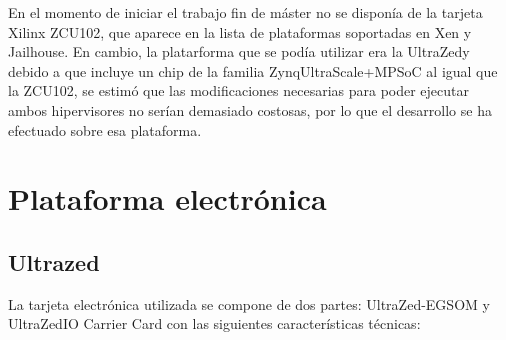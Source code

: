 En el momento de iniciar el trabajo fin de máster no se disponía de la tarjeta Xilinx ZCU102, que aparece en la lista de plataformas soportadas en Xen y Jailhouse. En cambio, la platarforma que se podía utilizar era la UltraZed\texttrademark y debido a que incluye un chip de la familia Zynq\textregistered UltraScale+\texttrademark MPSoC al igual que la ZCU102, se estimó que las modificaciones necesarias para poder ejecutar ambos hipervisores no serían demasiado costosas, por lo que el desarrollo se ha efectuado sobre esa plataforma.

\section{Plataforma electrónica}
\subsection{Ultrazed\texttrademark}
La tarjeta electrónica utilizada se compone de dos partes: UltraZed-EG\texttrademark \acrshort{SOM} y UltraZed\texttrademark IO Carrier Card con las siguientes características técnicas:
